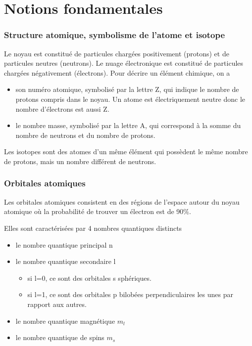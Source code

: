 
\usepackage{multirow}
\usepackage[version=3]{mhchem}

\usepackage{layout}

{}{}

\part{Notions fondamentales}
\section{Structure atomique, symbolisme de l'atome et isotope}
Le noyau est constitué de particules chargées positivement (protons) et de particules neutres (neutrons).
Le nuage électronique est constitué de particules chargées négativement (électrons).
Pour décrire un élément chimique, on a
\begin{itemize}
  \item son numéro atomique, symbolisé par la lettre Z, qui indique le nombre de protons compris dans le noyau.
    Un atome est électriquement neutre donc le nombre d'électrons est aussi Z.
  \item le nombre masse, symbolisé par la lettre A, qui correspond à la somme du nombre de neutrons et du nombre de protons.
\end{itemize}
Les isotopes sont des atomes d'un même élément qui possèdent le même nombre de protons, mais un nombre différent de neutrons.
\section{Orbitales atomiques}
Les orbitales atomiques consistent en des régions de l'espace autour du noyau atomique où la probabilité de trouver un électron est de 90$\%$.

Elles sont caractérisées par 4 nombres quantiques distincts
\begin{itemize}
  \item le nombre quantique principal n
  \item le nombre quantique secondaire l
    \begin{itemize}
      \item si l=0, ce sont des orbitales s sphériques.
      \item si l=1, ce sont des orbitales p bilobées perpendiculaires les unes par rapport aux autres.
    \end{itemize}
  \item le nombre quantique magnétique $m_l$
  \item le nombre quantique de spins $m_s$
\end{itemize}


